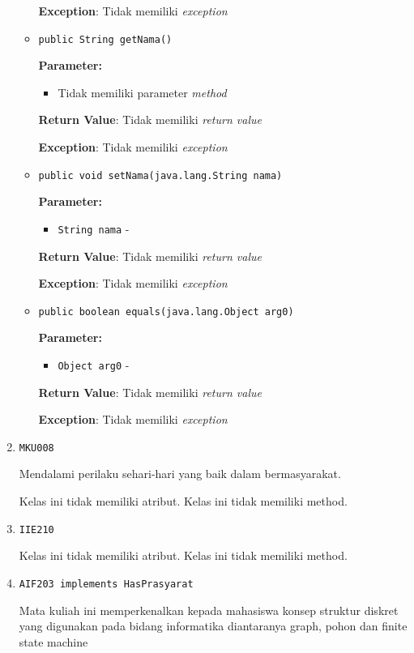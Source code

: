 \documentclass{article}
\begin{document}
\begin{enumerate}
\begin{itemize}
\textbf{Exception}: Tidak memiliki \textit{exception}

\item \texttt{public String getNama()}



\textbf{Parameter:}
\begin{itemize}
\item Tidak memiliki parameter \textit{method}
\end{itemize}
\textbf{Return Value}: Tidak memiliki \textit{return value}

\textbf{Exception}: Tidak memiliki \textit{exception}

\item \texttt{public void setNama(java.lang.String nama)}



\textbf{Parameter:}
\begin{itemize}
\item \texttt{String nama} - 
\end{itemize}
\textbf{Return Value}: Tidak memiliki \textit{return value}

\textbf{Exception}: Tidak memiliki \textit{exception}

\item \texttt{public boolean equals(java.lang.Object arg0)}



\textbf{Parameter:}
\begin{itemize}
\item \texttt{Object arg0} - 
\end{itemize}
\textbf{Return Value}: Tidak memiliki \textit{return value}

\textbf{Exception}: Tidak memiliki \textit{exception}

\end{itemize}
\item \texttt{MKU008}

Mendalami perilaku sehari-hari yang baik dalam bermasyarakat.

Kelas ini tidak memiliki atribut. Kelas ini tidak memiliki method. \item \texttt{IIE210}



Kelas ini tidak memiliki atribut. Kelas ini tidak memiliki method. \item \texttt{AIF203 implements HasPrasyarat}

Mata kuliah ini memperkenalkan kepada mahasiswa konsep struktur diskret yang 
 digunakan pada bidang informatika diantaranya graph, pohon dan finite state 
 machine


\end{enumerate}
\end{document}
